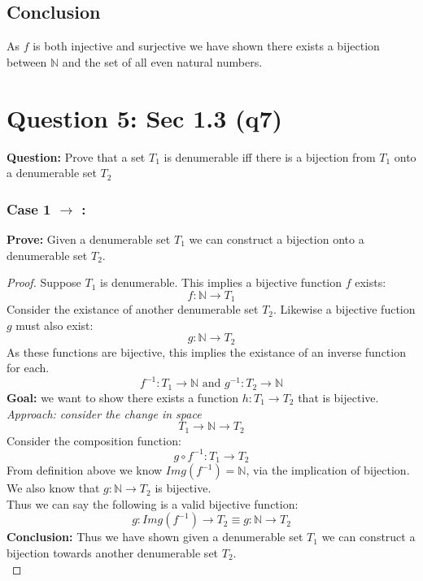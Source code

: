 \documentclass[11pt]{article}
\theoremstyle{plain}
\begin{document}
\subsection*{Conclusion}
As $f$ is both injective and surjective we have shown there exists a bijection between $\mathbb{N}$ and the set of all even natural numbers.
\section*{Question 5: Sec 1.3 (q7)}
\textbf{Question:} Prove that a set $T_1$ is denumerable iff there is a bijection from $T_1$ onto a denumerable set $T_2$
\subsubsection*{Case 1 $\rightarrow$  :}
\textbf{Prove:} Given a denumerable set $T_1$ we can construct a bijection onto a denumerable set $T_2$.
\begin{proof}
	Suppose $T_1$ is denumerable. This implies a bijective function $f$ exists:
	\[
		f: \mathbb{N} \rightarrow T_1
	\]
	Consider the existance of another denumerable set $T_2$. Likewise a bijective fuction $g$ must also exist:
	\[
		g: \mathbb{N} \rightarrow T_2
	\]
	As these functions are bijective, this implies the existance of an inverse function for each.
	\[
		f^{-1}: T_1 \rightarrow \mathbb{N} \text{ and } g^{-1}: T_2 \rightarrow \mathbb{N}
	\]
	\textbf{Goal:} we want to show there exists a function $h: T_1 \rightarrow T_2$ that is bijective. \\
	\textit{Approach: consider the change in space}
	\[
		T_1 \rightarrow \mathbb{N} \rightarrow T_2
	\]
	Consider the composition function:
	\[
		g \circ f^{-1}: T_1 \rightarrow T_2
	\]
	From definition above we know $Img(f^{-1}) = \mathbb{N}$, via the implication of bijection. \\
	We also know that $g: \mathbb{N} \rightarrow T_2$ is bijective. \\
	Thus we can say the following is a valid bijective function:
	\[
		g: Img(f^{-1}) \rightarrow T_2 \equiv g: \mathbb{N} \rightarrow T_2
	\]
	\textbf{Conclusion:} Thus we have shown given a denumerable set $T_1$ we can construct a bijection towards another denumerable set $T_2$. \\
\end{proof}
\end{document}
